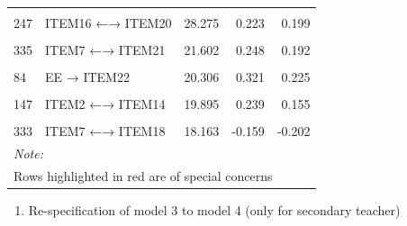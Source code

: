 \documentclass[
]{article}
\providecommand{\tightlist}{%
  \setlength{\itemsep}{0pt}\setlength{\parskip}{0pt}}
\begin{document}
\begin{table}
\begin{tabular}[t]{llrrr}
\hspace{1em}\textcolor{red}{\cellcolor{gray!6}{339}} & \textcolor{red}{\cellcolor{gray!6}{ITEM9 ←→ ITEM19}} & \textcolor{red}{\cellcolor{gray!6}{42.687}} & \textcolor{red}{\cellcolor{gray!6}{0.351}} & \textcolor{red}{\cellcolor{gray!6}{0.355}}\\
\hspace{1em}247 & ITEM16 ←→ ITEM20 & 28.275 & 0.223 & 0.199\\
\hspace{1em}\cellcolor{gray!6}{345} & \cellcolor{gray!6}{ITEM17 ←→ ITEM18} & \cellcolor{gray!6}{21.951} & \cellcolor{gray!6}{0.148} & \cellcolor{gray!6}{0.221}\\
\hspace{1em}335 & ITEM7 ←→ ITEM21 & 21.602 & 0.248 & 0.192\\
\hspace{1em}\cellcolor{gray!6}{346} & \cellcolor{gray!6}{ITEM17 ←→ ITEM19} & \cellcolor{gray!6}{20.837} & \cellcolor{gray!6}{-0.160} & \cellcolor{gray!6}{-0.218}\\
\hspace{1em}84 & EE → ITEM22 & 20.306 & 0.321 & 0.225\\
\hspace{1em}\cellcolor{gray!6}{98} & \cellcolor{gray!6}{DP → ITEM14} & \cellcolor{gray!6}{20.142} & \cellcolor{gray!6}{-0.404} & \cellcolor{gray!6}{-0.210}\\
\hspace{1em}147 & ITEM2 ←→ ITEM14 & 19.895 & 0.239 & 0.155\\
\hspace{1em}\cellcolor{gray!6}{149} & \cellcolor{gray!6}{ITEM2 ←→ ITEM20} & \cellcolor{gray!6}{18.463} & \cellcolor{gray!6}{-0.164} & \cellcolor{gray!6}{-0.155}\\
\hspace{1em}333 & ITEM7 ←→ ITEM18 & 18.163 & -0.159 & -0.202\\
\bottomrule
\multicolumn{5}{l}{\rule{0pt}{1em}\textit{Note: }}\\
\multicolumn{5}{l}{\rule{0pt}{1em}Rows highlighted in red are of special concerns}\\
\end{tabular}
\end{table}

\begin{enumerate}
\def\labelenumi{(\arabic{enumi})}
\setcounter{enumi}{2}
\tightlist
\item
  Re-specification of model 3 to model 4 (only for secondary teacher)
\end{enumerate}
\end{document}

